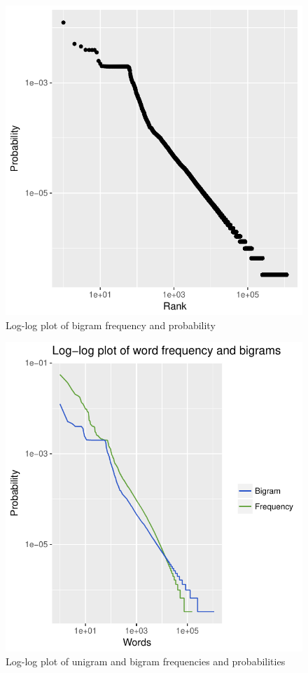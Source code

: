 \documentclass[letterpaper,11pt]{article}
\begin{document}
   \begin{figure}[h]
  \centering
  \includegraphics[scale=0.6]{bigram.pdf}
  \caption{Log-log plot of bigram frequency and probability}
  \label{fig:q1p2}
  \end{figure}
  
   \begin{figure}[h]
  \centering
  \includegraphics[scale=0.9]{unigram_and_bigram.pdf}
  \caption{Log-log plot of unigram and bigram frequencies and probabilities}
  \label{fig:q1p3}
  \end{figure}
\end{document}
